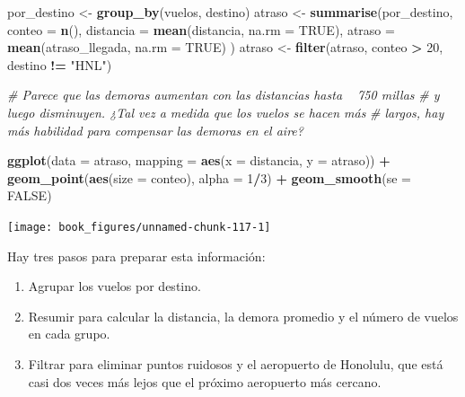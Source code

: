 \documentclass[11pt,oneside]{report}
\newenvironment{Shaded}{\begin{snugshade}}{\end{snugshade}}
\newcommand{\CommentTok}[1]{\textcolor[rgb]{0.56,0.35,0.01}{\textit{#1}}}
\newcommand{\DataTypeTok}[1]{\textcolor[rgb]{0.13,0.29,0.53}{#1}}
\newcommand{\DecValTok}[1]{\textcolor[rgb]{0.00,0.00,0.81}{#1}}
\newcommand{\KeywordTok}[1]{\textcolor[rgb]{0.13,0.29,0.53}{\textbf{#1}}}
\newcommand{\NormalTok}[1]{#1}
\newcommand{\OperatorTok}[1]{\textcolor[rgb]{0.81,0.36,0.00}{\textbf{#1}}}
\newcommand{\OtherTok}[1]{\textcolor[rgb]{0.56,0.35,0.01}{#1}}
\newcommand{\StringTok}[1]{\textcolor[rgb]{0.31,0.60,0.02}{#1}}
\begin{document}
\begin{Shaded}
\begin{Highlighting}[]
\NormalTok{por_destino <-}\StringTok{ }\KeywordTok{group_by}\NormalTok{(vuelos, destino)}
\NormalTok{atraso <-}\StringTok{ }\KeywordTok{summarise}\NormalTok{(por_destino,}
  \DataTypeTok{conteo =} \KeywordTok{n}\NormalTok{(),}
  \DataTypeTok{distancia =} \KeywordTok{mean}\NormalTok{(distancia, }\DataTypeTok{na.rm =} \OtherTok{TRUE}\NormalTok{),}
  \DataTypeTok{atraso =} \KeywordTok{mean}\NormalTok{(atraso_llegada, }\DataTypeTok{na.rm =} \OtherTok{TRUE}\NormalTok{)}
\NormalTok{)}
\NormalTok{atraso <-}\StringTok{ }\KeywordTok{filter}\NormalTok{(atraso, conteo }\OperatorTok{>}\StringTok{ }\DecValTok{20}\NormalTok{, destino }\OperatorTok{!=}\StringTok{ "HNL"}\NormalTok{)}

\CommentTok{# Parece que las demoras aumentan con las distancias hasta ~ 750 millas}
\CommentTok{# y luego disminuyen. ¿Tal vez a medida que los vuelos se hacen más}
\CommentTok{# largos, hay más habilidad para compensar las demoras en el aire?}

\KeywordTok{ggplot}\NormalTok{(}\DataTypeTok{data =}\NormalTok{ atraso, }\DataTypeTok{mapping =} \KeywordTok{aes}\NormalTok{(}\DataTypeTok{x =}\NormalTok{ distancia, }\DataTypeTok{y =}\NormalTok{ atraso)) }\OperatorTok{+}
\StringTok{  }\KeywordTok{geom_point}\NormalTok{(}\KeywordTok{aes}\NormalTok{(}\DataTypeTok{size =}\NormalTok{ conteo), }\DataTypeTok{alpha =} \DecValTok{1}\OperatorTok{/}\DecValTok{3}\NormalTok{) }\OperatorTok{+}
\StringTok{  }\KeywordTok{geom_smooth}\NormalTok{(}\DataTypeTok{se =} \OtherTok{FALSE}\NormalTok{)}
\end{Highlighting}
\end{Shaded}

\begin{center}\texttt{[image: book\_figures/unnamed-chunk-117-1]} \end{center}

Hay tres pasos para preparar esta información:

\begin{enumerate}
\def\labelenumi{\arabic{enumi}.}
\item
  Agrupar los vuelos por destino.
\item
  Resumir para calcular la distancia, la demora promedio y el número de
  vuelos en cada grupo.
\item
  Filtrar para eliminar puntos ruidosos y el aeropuerto de Honolulu, que
  está casi dos veces más lejos que el próximo aeropuerto más cercano.
\end{enumerate}
\end{document}
